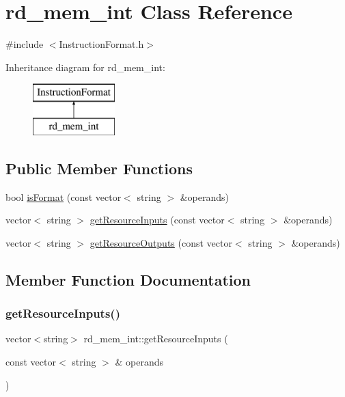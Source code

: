 \hypertarget{classrd__mem__int}{}\section{rd\+\_\+mem\+\_\+int Class Reference}
\label{classrd__mem__int}


{\ttfamily \#include $<$Instruction\+Format.\+h$>$}

Inheritance diagram for rd\+\_\+mem\+\_\+int\+:\begin{figure}[H]
\begin{center}
\leavevmode
\includegraphics[height=2.000000cm]{classrd__mem__int}
\end{center}
\end{figure}
\subsection*{Public Member Functions}
\begin{DoxyCompactItemize}
\item 
bool \hyperlink{classrd__mem__int_a7cf061c18744708846c625ccf275fc3f}{is\+Format} (const vector$<$ string $>$ \&operands)
\item 
vector$<$ string $>$ \hyperlink{classrd__mem__int_ae5e48b6200ba20ace72f78d1baa3a2fd}{get\+Resource\+Inputs} (const vector$<$ string $>$ \&operands)
\item 
vector$<$ string $>$ \hyperlink{classrd__mem__int_a73d6daee8115110da422c2dc8685c6ea}{get\+Resource\+Outputs} (const vector$<$ string $>$ \&operands)
\end{DoxyCompactItemize}


\subsection{Member Function Documentation}
\mbox{\label{classrd__mem__int_ae5e48b6200ba20ace72f78d1baa3a2fd}} 
\subsubsection{\texorpdfstring{get\+Resource\+Inputs()}{getResourceInputs()}}
{\footnotesize\ttfamily vector$<$string$>$ rd\+\_\+mem\+\_\+int\+::get\+Resource\+Inputs (\begin{DoxyParamCaption}\item[{const vector$<$ string $>$ \&}]{operands }\end{DoxyParamCaption})\hspace{0.3cm}{\ttfamily [virtual]}}

